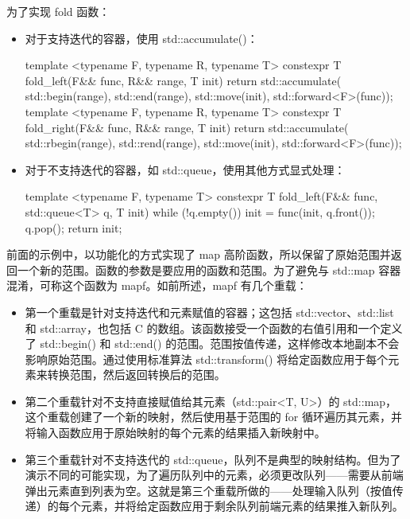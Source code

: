 为了实现 fold 函数：

\begin{itemize}
\item
对于支持迭代的容器，使用 std::accumulate()：

\begin{cpp}
template <typename F, typename R, typename T>
constexpr T fold_left(F&& func, R&& range, T init)
{
    return std::accumulate(
        std::begin(range), std::end(range),
        std::move(init),
        std::forward<F>(func));
}
template <typename F, typename R, typename T>
constexpr T fold_right(F&& func, R&& range, T init)
{
    return std::accumulate(
        std::rbegin(range), std::rend(range),
        std::move(init),
        std::forward<F>(func));
}
\end{cpp}

\item
对于不支持迭代的容器，如 std::queue，使用其他方式显式处理：

\begin{cpp}
template <typename F, typename T>
constexpr T fold_left(F&& func, std::queue<T> q, T init)
{
    while (!q.empty())
    {
        init = func(init, q.front());
        q.pop();
    }
    return init;
}
\end{cpp}

\end{itemize}


前面的示例中，以功能化的方式实现了 map 高阶函数，所以保留了原始范围并返回一个新的范围。函数的参数是要应用的函数和范围。为了避免与 std::map 容器混淆，可称这个函数为 mapf。如前所述，mapf 有几个重载：

\begin{itemize}
\item
第一个重载是针对支持迭代和元素赋值的容器；这包括 std::vector、std::list 和 std::array，也包括 C 的数组。该函数接受一个函数的右值引用和一个定义了 std::begin() 和 std::end() 的范围。范围按值传递，这样修改本地副本不会影响原始范围。通过使用标准算法 std::transform() 将给定函数应用于每个元素来转换范围，然后返回转换后的范围。

\item
第二个重载针对不支持直接赋值给其元素（std::pair<T, U>）的 std::map，这个重载创建了一个新的映射，然后使用基于范围的 for 循环遍历其元素，并将输入函数应用于原始映射的每个元素的结果插入新映射中。

\item
第三个重载针对不支持迭代的 std::queue，队列不是典型的映射结构。但为了演示不同的可能实现，为了遍历队列中的元素，必须更改队列——需要从前端弹出元素直到列表为空。这就是第三个重载所做的——处理输入队列（按值传递）的每个元素，并将给定函数应用于剩余队列前端元素的结果推入新队列。
\end{itemize}

